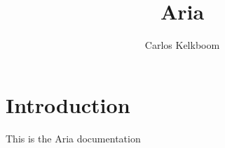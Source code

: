 \documentclass[•]{article}
\title{Aria}
\author{Carlos Kelkboom}
\begin{document}
\maketitle
\newpage
\printindex
\newpage

\section{Introduction}
This is the Aria documentation



\end{document}
